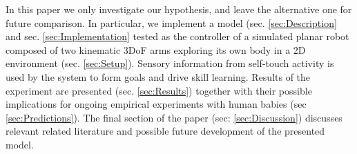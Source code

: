 In this paper we only investigate our hypothesis, and leave the alternative one for future comparison. In particular, we implement a model (sec. \ref{sec:Description} and sec. \ref{sec:Implementation} tested as the controller of a simulated planar robot composed of two kinematic 3DoF arms exploring its own body in a 2D environment (sec. \ref{sec:Setup}). Sensory information from self-touch activity is used by the system to form goals and drive skill learning. Results of the experiment are presented (sec. \ref{sec:Results}) together with their possible implications for ongoing empirical experiments with human babies (sec \ref{sec:Predictions}). The final section of the paper (sec: \ref{sec:Discussion}) discusses relevant related literature and possible future development of the presented model.


